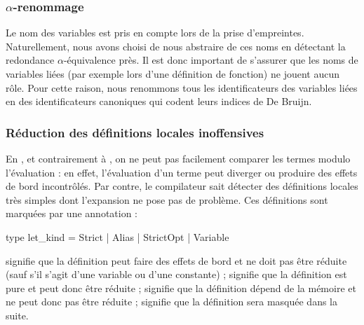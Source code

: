\subsubsection{$\alpha$-renommage}

Le nom des variables est pris en compte lors de la prise d'empreintes.
Naturellement, nous avons choisi de nous abstraire de ces noms en
détectant la redondance $\alpha$-équivalence près. Il est donc
important de s'assurer que les noms de variables liées (par exemple
lors d'une définition de fonction) ne jouent aucun rôle. Pour cette
raison, nous renommons tous les identificateurs des variables liées en
des identificateurs canoniques qui codent leurs indices de De Bruijn.

\subsubsection{Réduction des définitions locales inoffensives}

En {\OCaml}, et contrairement à {\Coq}, on ne peut pas facilement
comparer les termes modulo l'évaluation : en effet, l'évaluation d'un
terme peut diverger ou produire des effets de bord incontrôlés.
%
Par contre, le compilateur sait détecter des définitions locales
très simples dont l'expansion ne pose pas de problème. Ces définitions
sont marquées par une annotation :

\begin{ocaml}
type let_kind = Strict | Alias | StrictOpt | Variable
\end{ocaml}

\noindent {} signifie que la définition peut faire
des effets de bord et ne doit pas être réduite (sauf s'il s'agit
d'une variable ou d'une constante) ;  signifie que
la définition est pure et peut donc être réduite ; 
signifie que la définition dépend de la mémoire et ne peut donc pas
être réduite ;  signifie que la définition sera
masquée dans la suite. 



